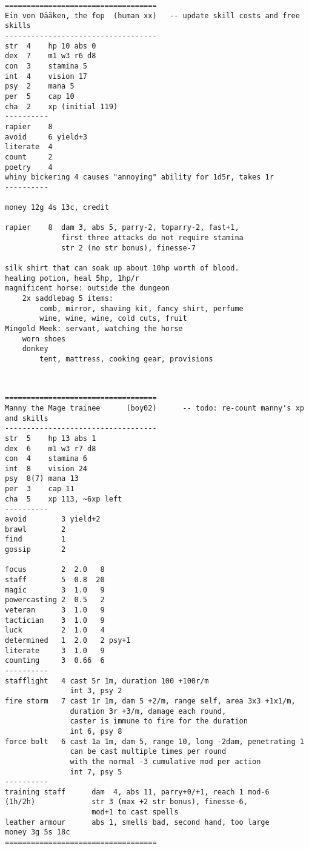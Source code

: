 \pagebreak[1]
\tiny \begin{samepage} \begin{verbatim}
===================================
Ein von Dääken, the fop  (human xx)   -- update skill costs and free skills
-----------------------------------
str  4    hp 10 abs 0
dex  7    m1 w3 r6 d8
con  3    stamina 5
int  4    vision 17
psy  2    mana 5
per  5    cap 10
cha  2    xp (initial 119)
----------
rapier    8
avoid     6 yield+3
literate  4
count     2
poetry    4
whiny bickering 4 causes "annoying" ability for 1d5r, takes 1r
----------

money 12g 4s 13c, credit

rapier    8  dam 3, abs 5, parry-2, toparry-2, fast+1,
             first three attacks do not require stamina
             str 2 (no str bonus), finesse-7

silk shirt that can soak up about 10hp worth of blood.
healing potion, heal 5hp, 1hp/r
magnificent horse: outside the dungeon
    2x saddlebag 5 items:
        comb, mirror, shaving kit, fancy shirt, perfume
        wine, wine, wine, cold cuts, fruit
Mingold Meek: servant, watching the horse
    worn shoes
    donkey
        tent, mattress, cooking gear, provisions
\end{verbatim} \end{samepage} \normalsize


\

\pagebreak[1]
\tiny \begin{samepage} \begin{verbatim}
===================================
Manny the Mage trainee      (boy02)      -- todo: re-count manny's xp and skills
-----------------------------------
str  5    hp 13 abs 1
dex  6    m1 w3 r7 d8
con  4    stamina 6
int  8    vision 24
psy  8(7) mana 13
per  3    cap 11
cha  5    xp 113, ~6xp left
----------
avoid        3 yield+2
brawl        2
find         1
gossip       2

focus        2  2.0   8
staff        5  0.8  20
magic        3  1.0   9
powercasting 2  0.5   2
veteran      3  1.0   9
tactician    3  1.0   9
luck         2  1.0   4
determined   1  2.0   2 psy+1
literate     3  1.0   9
counting     3  0.66  6
----------
stafflight   4 cast 5r 1m, duration 100 +100r/m
               int 3, psy 2
fire storm   7 cast 1r 1m, dam 5 +2/m, range self, area 3x3 +1x1/m,
               duration 3r +3/m, damage each round,
               caster is immune to fire for the duration
               int 6, psy 8
force bolt   6 cast 1a 1m, dam 5, range 10, long -2dam, penetrating 1
               can be cast multiple times per round
               with the normal -3 cumulative mod per action
               int 7, psy 5
----------
training staff      dam  4, abs 11, parry+0/+1, reach 1 mod-6
(1h/2h)             str 3 (max +2 str bonus), finesse-6,
                    mod+1 to cast spells
leather armour      abs 1, smells bad, second hand, too large
money 3g 5s 18c
===================================
\end{verbatim} \end{samepage} \normalsize


